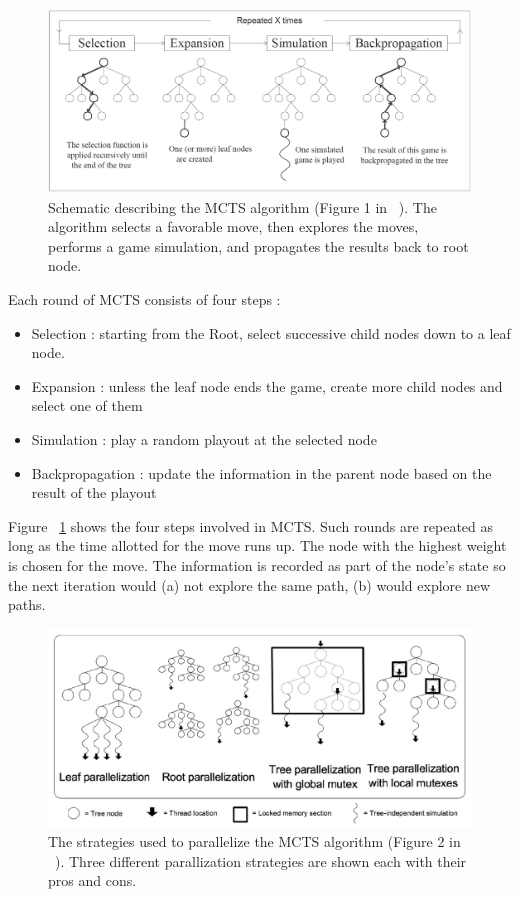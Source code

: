 \documentclass[nocopyrightspace, 10pt]{sigplanconf}
\begin{document}
\begin{figure} [h]
\begin{center}
\includegraphics[scale=0.2]{MCTS.PNG}
\end{center}
\caption{Schematic describing the MCTS algorithm (Figure 1 in ~\cite{SCAI11}). The algorithm selects a favorable move, then explores the moves, performs a game simulation, and propagates the results back to root node.}
\label{MCTS}
\end{figure}

Each round of MCTS consists of four steps :
\begin{itemize}
\item Selection : starting from the Root, select successive child nodes down to a leaf node. 
\item Expansion : unless the leaf node ends the game, create more child nodes and select one of them
\item Simulation : play a random playout at the selected node
\item Backpropagation : update the information in the parent node based on the result of the playout
\end{itemize}

Figure ~\ref{MCTS} shows the four steps involved in MCTS. Such rounds are repeated as long as the time allotted for the move runs up. The node with the highest weight is chosen for the move. The information is recorded as part of the node's state so the next iteration would (a) not explore the same path, (b) would explore new paths. 


\begin{figure} [h]
\begin{center}
\includegraphics[scale=0.25]{PARMCTS.PNG}
\end{center}
\caption{The strategies used to parallelize the MCTS algorithm (Figure 2 in ~\cite{SCAI11}). Three different parallization strategies are shown each with their pros and cons.}
\label{PARMCTS}
\end{figure}
\end{document}
